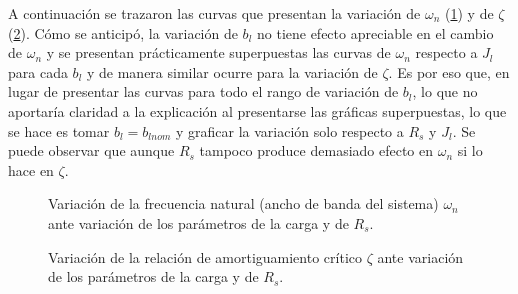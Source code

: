 \documentclass[a4paper, 10pt, onecolumn,journal]{ieeeconf}
\begin{document}
A continuación se trazaron las curvas que presentan la variación
de $\omega_n$ (\cref{variacion de omega_n}) y de $\zeta$ (\cref{variacion de zita}). Cómo se anticipó,
la variación de $b_l$ no tiene efecto apreciable en el cambio de $\omega_n$ y se presentan prácticamente superpuestas
las curvas de $\omega_n$ respecto a $J_l$ para cada $b_l$ y de manera similar ocurre para la variación de $\zeta$.
Es por eso que, en lugar de presentar las curvas para todo el rango de variación de $b_l$, lo que no aportaría claridad
a la explicación al presentarse las gráficas superpuestas, lo que se hace es tomar $b_l = b_{lnom}$ y graficar la variación
solo respecto a $R_s$ y $J_l$. Se puede observar que aunque $R_s$ tampoco produce demasiado efecto en $\omega_n$ si lo hace en $\zeta$.

\begin{figure}[H]
	\centering
	\begin{adjustbox}{scale=0.5,max width=\columnwidth}
	\end{adjustbox}
	\caption{Variación de la frecuencia natural (ancho de banda del sistema) $\omega_n$ ante variación de los parámetros de la carga y de $R_s$.}
	\label{variacion de omega_n}
\end{figure}

\begin{figure}[H]
	\centering
	\begin{adjustbox}{scale=0.5,max width=\columnwidth}
	\end{adjustbox}
	\caption{Variación de la relación de amortiguamiento crítico $\zeta$ ante variación de los parámetros de la carga y de $R_s$.}
	\label{variacion de zita}
\end{figure}
\end{document}
